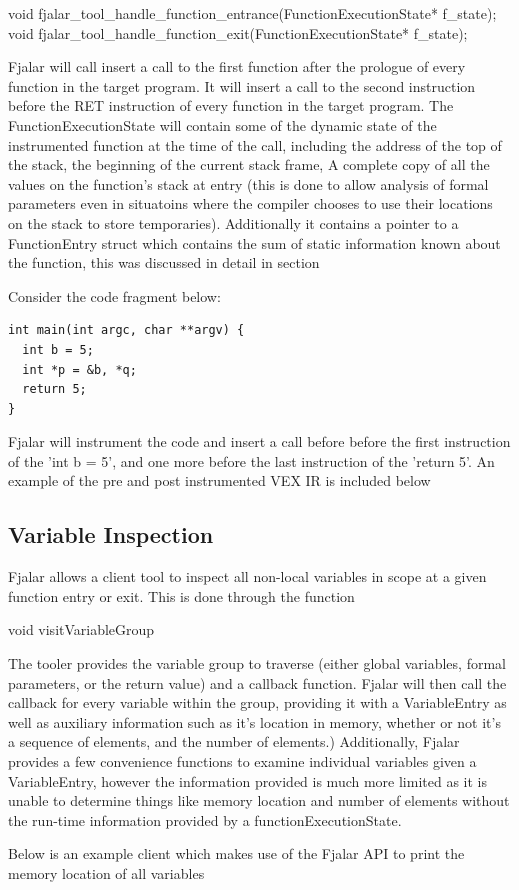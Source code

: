 \documentclass[11pt]{article}
\begin{document}
void fjalar\_tool\_handle\_function\_entrance(FunctionExecutionState* f\_state);
void fjalar\_tool\_handle\_function\_exit(FunctionExecutionState*
f\_state);

Fjalar will call insert a call to the first function after the
prologue of every function in the target program. It will insert a
call to the second instruction before the RET instruction of every
function in the target program. The FunctionExecutionState will
contain some of the dynamic state of the instrumented function at the
time of the call, including the address of the top of the stack, the
beginning of the current stack frame, A complete copy of all the
values on the function's stack at entry (this is done to allow
analysis of formal parameters even in situatoins where the compiler
chooses to use their locations on the stack to store temporaries). 
Additionally it contains a pointer to a FunctionEntry struct which
contains the sum of static information known about the function, this
was discussed in detail in section %

Consider the code fragment below:

\lstset{language=C, frame=single}
\begin{lstlisting}
int main(int argc, char **argv) {
  int b = 5;
  int *p = &b, *q;
  return 5;
}
\end{lstlisting}

Fjalar will instrument the code and insert a call before before the
first instruction of the 'int b = 5', and one more before the last
instruction of the 'return 5'. An example of the pre and post
instrumented  VEX IR is included below


\subsection{Variable Inspection}

Fjalar allows a client tool to inspect all non-local  variables in
scope at a given function entry or exit. This is done through the
function 

void visitVariableGroup

The tooler provides the variable group to traverse (either global
variables, formal parameters, or the return value) and a callback
function. Fjalar will then call the callback for every variable within
the group, providing it with a VariableEntry as well as auxiliary
information such as it's location in memory, whether or not it's a
sequence of elements, and the number of elements.) Additionally,
Fjalar provides a few convenience functions to examine individual
variables given a VariableEntry, however the information provided is
much more limited as it is unable to determine things like memory
location and number of elements without the run-time information
provided by a functionExecutionState.

Below is an example client  which makes use of the Fjalar API to print
the memory location of all variables



\end{document}
